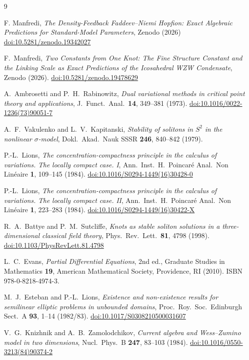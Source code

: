 \documentclass[11pt,a4paper]{article}
\theoremstyle{remark}
\begin{document}
\begin{thebibliography}{9}

F. Manfredi,
\textit{The Density-Feedback Faddeev--Niemi Hopfion:
  Exact Algebraic Predictions for Standard-Model Parameters},
  Zenodo (2026)
\href{https://doi.org/10.5281/zenodo.19342027}{doi:10.5281/zenodo.19342027}

F.~Manfredi,
\textit{Two Constants from One Knot: The Fine Structure Constant and
  the Linking Scale as Exact Predictions of the Icosahedral WZW Condensate},
Zenodo (2026).
\href{https://doi.org/10.5281/zenodo.19478629}{doi:10.5281/zenodo.19478629}

A.~Ambrosetti and P.~H.~Rabinowitz,
\textit{Dual variational methods in critical point theory and applications},
J.\ Funct.\ Anal.\ \textbf{14}, 349--381 (1973).
\href{https://doi.org/10.1016/0022-1236(73)90051-7}{doi:10.1016/0022-1236(73)90051-7}

A.~F.~Vakulenko and L.~V.~Kapitanski,
\textit{Stability of solitons in $S^2$ in the nonlinear $\sigma$-model},
Dokl.\ Akad.\ Nauk SSSR \textbf{246}, 840--842 (1979).

P.-L.~Lions,
\textit{The concentration-compactness principle in the calculus of
  variations. The locally compact case. I},
Ann.\ Inst.\ H.~Poincar\'e Anal.\ Non Lin\'eaire \textbf{1}, 109--145 (1984).
\href{https://doi.org/10.1016/S0294-1449(16)30428-0}{doi:10.1016/S0294-1449(16)30428-0}

P.-L.~Lions,
\textit{The concentration-compactness principle in the calculus of
  variations. The locally compact case. II},
Ann.\ Inst.\ H.~Poincar\'e Anal.\ Non Lin\'eaire \textbf{1}, 223--283 (1984).
\href{https://doi.org/10.1016/S0294-1449(16)30422-X}{doi:10.1016/S0294-1449(16)30422-X}

R.~A.~Battye and P.~M.~Sutcliffe,
\textit{Knots as stable soliton solutions in a three-dimensional
  classical field theory},
Phys.\ Rev.\ Lett.\ \textbf{81}, 4798 (1998).
\href{https://doi.org/10.1103/PhysRevLett.81.4798}{doi:10.1103/PhysRevLett.81.4798}

L.~C.~Evans,
\textit{Partial Differential Equations}, 2nd ed.,
Graduate Studies in Mathematics \textbf{19},
American Mathematical Society, Providence, RI (2010).
ISBN 978-0-8218-4974-3.

M.~J.~Esteban and P.-L.~Lions,
\textit{Existence and non-existence results for semilinear elliptic problems in unbounded domains},
Proc.\ Roy.\ Soc.\ Edinburgh Sect.~A \textbf{93}, 1--14 (1982/83).
\href{https://doi.org/10.1017/S0308210500031607}{doi:10.1017/S0308210500031607}

V.~G.~Knizhnik and A.~B.~Zamolodchikov,
\textit{Current algebra and Wess--Zumino model in two dimensions},
Nucl.\ Phys.\ B \textbf{247}, 83--103 (1984).
\href{https://doi.org/10.1016/0550-3213(84)90374-2}{doi:10.1016/0550-3213(84)90374-2}

\end{thebibliography}
\end{document}

